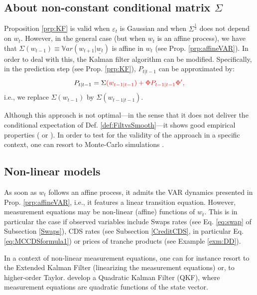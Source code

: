 \documentclass[
  12pt,
]{book}
\theoremstyle{definition}
\theoremstyle{definition}
\theoremstyle{definition}
\theoremstyle{definition}
\theoremstyle{remark}
\begin{document}
\hypertarget{KalmanQML}{%
\subsection{\texorpdfstring{About non-constant conditional matrix \(\Sigma\)}{About non-constant conditional matrix \textbackslash Sigma}}\label{KalmanQML}}

Proposition \ref{prp:KF} is valid when \(\varepsilon_t\) is Gaussian and when \(\Sigma^{\frac{1}{2}}\) does not depend on \(w_t\). However, in the general case (but when \(w_t\) is an affine process), we have that \(\Sigma(w_{t-1}) \equiv \mathbb{V}ar(w_{t+1}|\underline{w_t})\) is affine in \(w_t\) (see Prop. \ref{prp:affineVAR}). In order to deal with this, the Kalman filter algorithm can be modified. Specifically, in the prediction step (see Prop. \ref{prp:KF}), \(P_{t|t-1}\) can be approximated by:
\[
P_{t|t-1} = \Sigma\color{red}{(w_{t-1|t-1})} + \Phi P_{t-1|t-1} \Phi',
\]
i.e., we replace \(\Sigma(w_{t-1})\) by \(\Sigma(w_{t-1|t-1})\).

Although this approach is not optimal---in the sense that it does not deliver the conditional expectation of Def. \ref{def:FiltvsSmooth}---it shows good empirical properties (\citet{deJong_2000} or \citet{Duan_Simonato_1999}). In order to test for the validity of the approach in a specific context, one can resort to Monte-Carlo simulations \citep{zarg_2017}.

\hypertarget{nonlinear}{%
\subsection{Non-linear models}\label{nonlinear}}

As soon as \(w_t\) follows an affine process, it admits the VAR dynamics presented in Prop. \ref{prp:affineVAR}, i.e., it features a linear transition equation. However, measurement equations may be non-linear (affine) functions of \(w_t\). This is in particular the case if observed variables include Swaps rates (see Eq. \eqref{eq:swap} of Subsection \ref{Swaps}), CDS rates (see Subsection \ref{CreditCDS}, in particular Eq. \eqref{eq:MCCDSformula1}) or prices of tranche products (see Example \ref{exm:DD}).

In a context of non-linear measurement equations, one can for instance resort to the Extended Kalman Filter (linearizing the measurement equations) or, to higher-order Taylor. \citet{Monfort_Renne_Roussellet_2015} develop a Quadratic Kalman Filter (QKF), where measurement equations are quadratic functions of the state vector.
\end{document}
